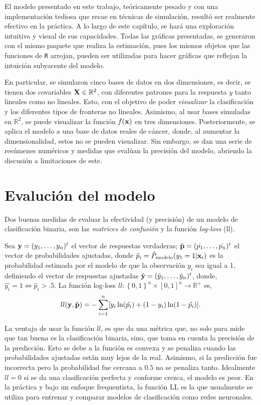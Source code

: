 \documentclass[../Main/Main.tex]{subfiles}
\begin{document}
El modelo presentado en este trabajo, teóricamente pesado y con una implementación tediosa que recae en técnicas de simulación, resultó ser realmente efectivo en la práctica. A lo largo de este capítulo, se hará una exploración intuitiva y visual de sus capacidades. Todas las gráficas presentadas, se generaron con el mismo paquete que realiza la estimación, pues los mismos objetos que las funciones de \verb|R| arrojan, pueden ser utilizadas para hacer gráficas que reflejan la intuición subyacente del modelo. 

En particular, se simularon cinco bases de datos en dos dimensiones, es decir, se tienen dos covariables $\mathbf{X}\in\mathbb{R}^2$,  con diferentes patrones para la respuesta $y$ tanto lineales como no lineales. Esto, con el objetivo de poder \textit{visualizar} la clasificación y los diferentes tipos de fronteras no lineales. Asimismo, al usar bases simuladas en $\mathbb{R}^2$, se puede visualizar la función $f(\mathbf{x})$ en tres dimensiones. Posteriormente, se aplica el modelo a una base de datos reales de cáncer, donde, al aumentar la dimensionalidad, estos no se pueden visualizar. Sin embargo, se dan una serie de resúmenes numéricos y medidas que evalúan la precisión del modelo, abriendo la discusión a limitaciones de este. 

\section{Evalución del modelo}
Dos buenas medidas de evaluar la efectividad (y precisión) de un modelo de clasificación binaria, son las \textit{matrices de confusión} y la función \textit{log-loss} (ll).

Sea $\mathbf{y} = (y_1,\ldots,y_n)^t$ el vector de respuestas verdaderas; $\hat{\mathbf{p}} = (\hat{p_1},\ldots,\hat{p_n})^t$ el vector de probabilidades ajustadas, donde $\hat{p}_i = \hat{P}_{\text{modelo}}(y_1 = 1|\mathbf{x}_i)$ es la probabilidad estimada por el modelo de que la observación $y_i$ sea igual a 1, definiendo el vector de respuestas ajustadas $\hat{\mathbf{y}} = (\hat{y}_1,\ldots,\hat{y}_n)^t$, donde, $\hat{y_i} = 1 \iff \hat{p}_i > .5$. La función log-loss $ll:\left\{0,1\right\}^n\times[0,1]^n\rightarrow \mathbb{R}^+$ es,
\begin{align}
	ll(\mathbf{y},\hat{\mathbf{p}}) = -\sum_{i = 1}^n[ y_i \ln(\hat{p_i}) + (1-y_i)\ln(1-\hat{p_i})]. \label{ec:LogLoss}
\end{align}

La ventaja de usar la función $ll$, es que da una métrica que, no solo para mide que tan buena es la clasificación binaria, sino, que toma en cuenta la precisión de la predicción. Esto se debe a la función es convexa y se penaliza cuando las probabilidades ajustadas están muy lejos de la real. Asimismo, si la predicción fue incorrecta pero la probabilidad fue cercana a $0.5$ no se penaliza tanto. Idealmente $ll = 0$ si se da una clasificación perfecta y conforme crezca, el modelo es peor. En la práctica y bajo un enfoque frequentista, la función LL es la que usualmente se utiliza para entrenar y comparar modelos de clasificación como redes neuronales.
\end{document}
